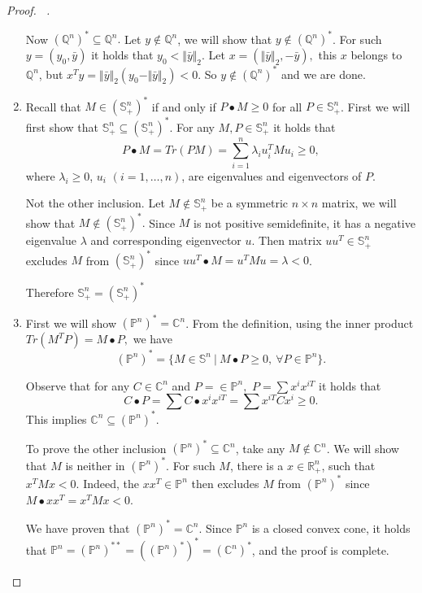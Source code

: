\documentclass[12pt]{book}
\theoremstyle{definition}
\begin{document}
\begin{appendix}
\begin{proof}[Proof. \ ]
\begin{enumerate}
Now $(\mathbb{Q}^n)^* \subseteq \mathbb{Q}^n.$ Let $y\notin \mathbb{Q}^n$, we will show that $y\notin (\mathbb{Q}^n)^*$.
For such $y = (y_0,\bar{y})$ it holds that $y_0<\Vert \bar{y}\Vert_2$. Let $x = (\Vert \bar{y}\Vert_2, -\bar{y}),$ 
this $x$ belongs to $\mathbb{Q}^n$, but $x^Ty = \Vert \bar{y}\Vert_2(y_0-\Vert \bar{y}\Vert_2)<0$. So $y\notin (\mathbb{Q}^n)^*$ and we are done.

\item Recall that $M \in (\mathbb{S}^n_+)^*$ if and only if $P\bullet M \geq 0$ for all $P\in \mathbb{S}^n_+$. First we will first show that $\mathbb{S}^n_+ \subseteq (\mathbb{S}^n_+)^*$. For any $M,P\in \mathbb{S}^n_+$ it holds that 
$$P\bullet M = Tr(PM) = \sum_{i=1}^n \lambda_iu_i^TMu_i \geq 0,$$
where $\lambda_i\geq 0$, $u_i$  $(i=1,\dots ,n)$, are eigenvalues and eigenvectors of $P$.

Not the other inclusion. Let $M\notin \mathbb{S}^n_+$ be a symmetric $n\times n$ matrix, we will show that $M\notin (\mathbb{S}^n_+)^*.$ Since $M$ is not positive semidefinite, it has a negative eigenvalue $\lambda$ and corresponding eigenvector $u$. Then matrix $uu^T\in \mathbb{S}^n_+$ excludes $M$ from $(\mathbb{S}^n_+)^*$ since $uu^T\bullet M = u^TMu = \lambda <0$.

Therefore $\mathbb{S}^n_+ = (\mathbb{S}^n_+)^*$

\item First we will show $(\mathbb{P}^n)^* = \mathbb{C}^n$. From the definition, using the inner product $Tr(M^TP) = M \bullet P,$ we have
$$ (\mathbb{P}^n)^* = \{ M \in \mathbb{S}^n \ \vert \ M\bullet P\geq 0, \ \forall P\in \mathbb{P}^n \}. $$

Observe that for any $C\in \mathbb{C}^n$ and $P = \in \mathbb{P}^n,$ $P = \sum x^ix^{iT}$ it holds that 
$$ C\bullet P = \sum C\bullet x^ix^{iT} = \sum x^{iT}Cx^i \geq 0.$$
This implies $\mathbb{C}^n\subseteq (\mathbb{P}^n)^*$.

To prove the other inclusion $(\mathbb{P}^n)^* \subseteq \mathbb{C}^n$, take any $M\notin \mathbb{C}^n$. We will show that $M$ is neither in $(\mathbb{P}^n)^*$. For such $M$, there is a $x\in\mathbb{R}^n_+$, such that $x^TMx<0$. Indeed, the $xx^T \in \mathbb{P}^n$ then excludes $M$ from $(\mathbb{P}^n)^*$ since $M\bullet xx^T = x^TMx<0.$

We have proven that $(\mathbb{P}^n)^* = \mathbb{C}^n$. Since $\mathbb{P}^n$ is a closed convex cone, it holds that $\mathbb{P}^n = (\mathbb{P}^n)^{**} = ((\mathbb{P}^n)^{*})^* = (\mathbb{C}^n)^*$, and the proof is complete.


\end{enumerate}
\end{proof}
\end{appendix}
\end{document}
